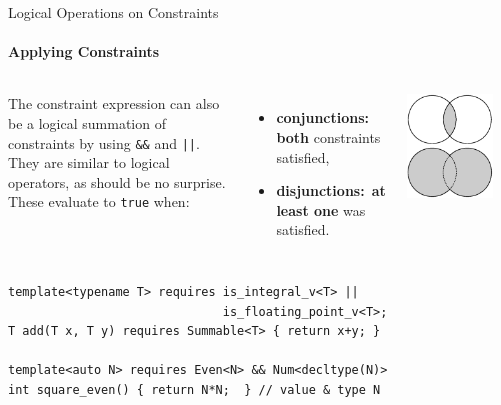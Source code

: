 \documentclass{beamer}
\begin{document}
    \begin{frame}[fragile]{Logical Operations on Constraints}
        \framesubtitle{Applying Constraints}
        \begin{columns}
            The constraint expression can also be a logical summation of constraints by using \texttt{\&\&} and \texttt{||}. They are similar to logical operators, as should be no surprise. These evaluate to \texttt{true} when: \hfill
            \vspace{-0.9em}
            \begin{itemize}
                \item{\textbf{conjunctions:} \textbf{both} constraints satisfied,}
                \item{\textbf{disjunctions:}\ \textbf{at least one} was satisfied.}
            \end{itemize}
            \begin{center}
                \includegraphics[width=0.815\textwidth]{figures/logical.eps}
            \vspace{1.0em}
            \end{center}
        \end{columns}
        \begin{center}
            \vspace{-1.0em}
            \begin{lstlisting}
template<typename T> requires is_integral_v<T> ||
                              is_floating_point_v<T>;
T add(T x, T y) requires Summable<T> { return x+y; }

template<auto N> requires Even<N> && Num<decltype(N)>
int square_even() { return N*N;  } // value & type N \end{lstlisting}
        \end{center}
    \end{frame}
\end{document}
